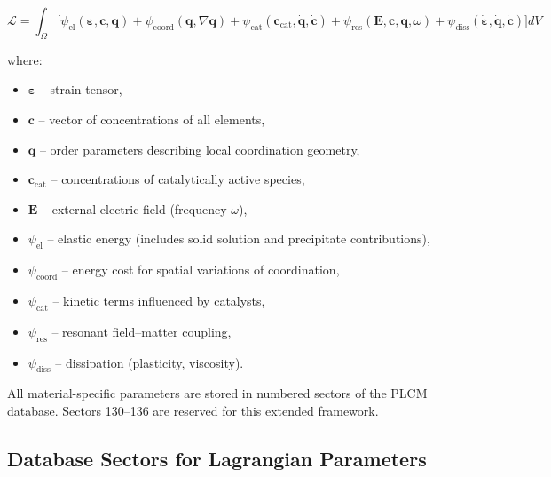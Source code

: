 \documentclass[12pt,a4paper]{article}
\begin{document}
	\[
	\mathcal{L} = \int_{\Omega} \Big[ 
	\psi_{\mathrm{el}}(\boldsymbol{\varepsilon}, \mathbf{c}, \mathbf{q}) 
	+ \psi_{\mathrm{coord}}(\mathbf{q}, \nabla\mathbf{q}) 
	+ \psi_{\mathrm{cat}}(\mathbf{c}_{\mathrm{cat}}, \dot{\mathbf{q}}, \dot{\mathbf{c}}) 
	+ \psi_{\mathrm{res}}(\mathbf{E}, \mathbf{c}, \mathbf{q}, \omega) 
	+ \psi_{\mathrm{diss}}(\dot{\boldsymbol{\varepsilon}}, \dot{\mathbf{q}}, \dot{\mathbf{c}})
	\Big] dV
	\]
	
	where:
	\begin{itemize}
		\item \(\boldsymbol{\varepsilon}\) – strain tensor,
		\item \(\mathbf{c}\) – vector of concentrations of all elements,
		\item \(\mathbf{q}\) – order parameters describing local coordination geometry,
		\item \(\mathbf{c}_{\mathrm{cat}}\) – concentrations of catalytically active species,
		\item \(\mathbf{E}\) – external electric field (frequency \(\omega\)),
		\item \(\psi_{\mathrm{el}}\) – elastic energy (includes solid solution and precipitate contributions),
		\item \(\psi_{\mathrm{coord}}\) – energy cost for spatial variations of coordination,
		\item \(\psi_{\mathrm{cat}}\) – kinetic terms influenced by catalysts,
		\item \(\psi_{\mathrm{res}}\) – resonant field–matter coupling,
		\item \(\psi_{\mathrm{diss}}\) – dissipation (plasticity, viscosity).
	\end{itemize}
	
	All material-specific parameters are stored in numbered sectors of the PLCM database. Sectors 130–136 are reserved for this extended framework.
	
	\subsection{Database Sectors for Lagrangian Parameters}
	\label{subsec:sectors}
	
\end{document}
